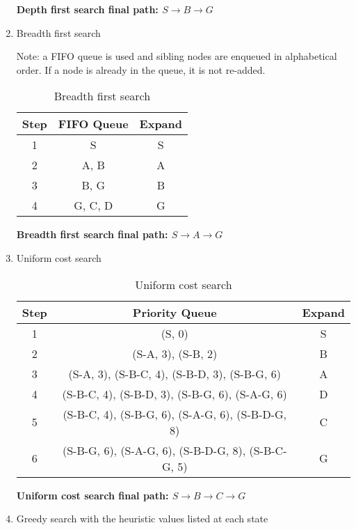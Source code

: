 \documentclass[fleqn]{hermans-hw}
\begin{document}
\begin{enumerate}
\textbf{Depth first search final path: $S \rightarrow B \rightarrow G$}

\item Breadth first search

Note: a FIFO queue is used and sibling nodes are enqueued in alphabetical order. If a node is already in the queue, it is not re-added.

\begin{table}[H]
\centering
{\renewcommand{\arraystretch}{1.2}%
\begin{tabular}{| c | c | c |}
\hline
\textbf{Step} & \textbf{FIFO Queue} & \textbf{Expand}\\
\hline
1 & S & S\\ \hline
2 & A, B & A\\ \hline
3 & B, G & B\\ \hline
4 & G, C, D & G\\ \hline
\end{tabular}}
\caption{Breadth first search}
\end{table}

\textbf{Breadth first search final path: $S \rightarrow A \rightarrow G$}

\item Uniform cost search

\begin{table}[H]
\centering
{\renewcommand{\arraystretch}{1.2}%
\begin{tabular}{| c | c | c |}
\hline
\textbf{Step} & \textbf{Priority Queue} & \textbf{Expand}\\
\hline
1 & (S, 0) & S\\ \hline
2 & (S-A, 3), (S-B, 2) & B\\ \hline
3 & (S-A, 3), (S-B-C, 4), (S-B-D, 3), (S-B-G, 6) & A\\ \hline
4 & (S-B-C, 4), (S-B-D, 3), (S-B-G, 6), (S-A-G, 6) & D\\ \hline
5 & (S-B-C, 4), (S-B-G, 6), (S-A-G, 6), (S-B-D-G, 8) & C\\ \hline
6 & (S-B-G, 6), (S-A-G, 6), (S-B-D-G, 8), (S-B-C-G, 5) & G\\ \hline
\end{tabular}}
\caption{Uniform cost search}
\end{table}

\textbf{Uniform cost search final path: $S \rightarrow B \rightarrow C \rightarrow G$}

\item Greedy search with the heuristic values listed at each state


\end{enumerate}
\end{document}
